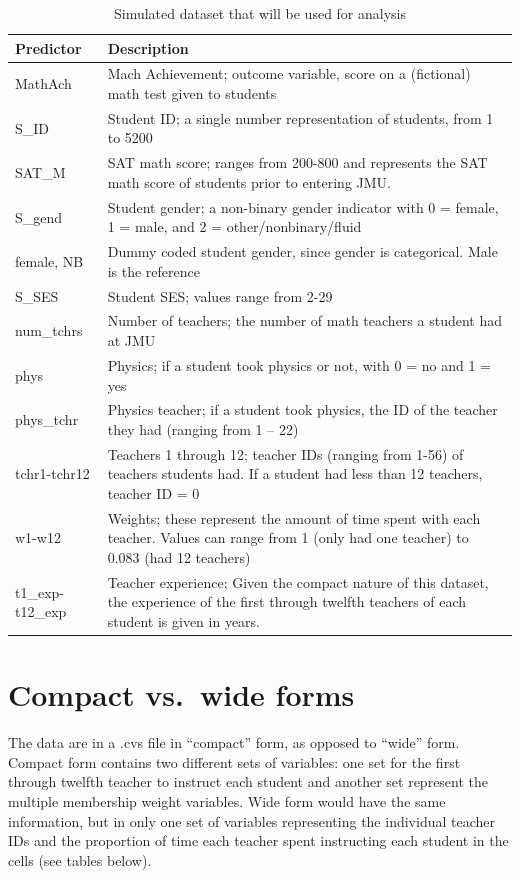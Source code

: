 \documentclass[
]{book}
\begin{document}
\begin{table}

\caption{\label{tab:data}Simulated dataset that will be used for analysis}
\centering
\begin{tabular}[t]{ll}
\toprule
Predictor & Description\\
\midrule
MathAch & Mach Achievement; outcome variable, score on a (fictional) math test given to students\\
S\_ID & Student ID; a single number representation of students, from 1 to 5200\\
SAT\_M & SAT math score; ranges from 200-800 and represents the SAT math score of students prior to entering JMU.\\
S\_gend & Student gender; a non-binary gender indicator with 0 = female, 1 = male, and 2 = other/nonbinary/fluid\\
female, NB & Dummy coded student gender, since gender is categorical.  Male is the reference\\
\addlinespace
S\_SES & Student SES; values range from 2-29\\
num\_tchrs & Number of teachers; the number of math teachers a student had at JMU\\
phys & Physics; if a student took physics or not, with 0 = no and 1 = yes\\
phys\_tchr & Physics teacher; if a student took physics, the ID of the teacher they had (ranging from 1 – 22)\\
tchr1-tchr12 & Teachers 1 through 12; teacher IDs (ranging from 1-56) of teachers students had.  If a student had less than 12 teachers, teacher ID = 0\\
\addlinespace
w1-w12 & Weights; these represent the amount of time spent with each teacher.  Values can range from 1 (only had one teacher) to 0.083 (had 12 teachers)\\
t1\_exp-t12\_exp & Teacher experience; Given the compact nature of this dataset, the experience of the first through twelfth teachers of each student is given in years.\\
\bottomrule
\end{tabular}
\end{table}

\hypertarget{compact}{%
\section{Compact vs.~wide forms}\label{compact}}

The data are in a .cvs file in ``compact'' form, as opposed to ``wide'' form. Compact form contains two different sets of variables: one set for the first through twelfth teacher to instruct each student and another set represent the multiple membership weight variables. Wide form would have the same information, but in only one set of variables representing the individual teacher IDs and the proportion of time each teacher spent instructing each student in the cells (see tables below).
\end{document}
